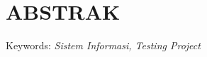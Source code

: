 %

\chapter*{ABSTRAK}

\begin{singlespace}
\lipsum[1-2] %
Keywords: \textit{Sistem Informasi, Testing Project}
\end{singlespace}

\newpage